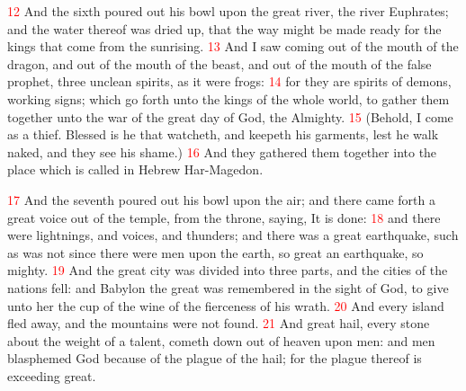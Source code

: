 \documentclass[12pt,twoside]{memoir}
\newcommand{\vnum}[1]{\textcolor{red}{\normalsize{#1}}}
\begin{document}
\vnum{12} And the sixth poured out his bowl upon the great river, the river Euphrates; and the water thereof was dried up, that the way might be made ready for the kings that come from the sunrising. 
\vnum{13} And I saw coming out of the mouth of the dragon, and out of the mouth of the beast, and out of the mouth of the false prophet, three unclean spirits, as it were frogs: 
\vnum{14} for they are spirits of demons, working signs; which go forth unto the kings of the whole world, to gather them together unto the war of the great day of God, the Almighty. 
\vnum{15} (Behold, I come as a thief. Blessed is he that watcheth, and keepeth his garments, lest he walk naked, and they see his shame.) 
\vnum{16} And they gathered them together into the place which is called in Hebrew Har-Magedon.

\vnum{17} And the seventh poured out his bowl upon the air; and there came forth a great voice out of the temple, from the throne, saying, It is done: 
\vnum{18} and there were lightnings, and voices, and thunders; and there was a great earthquake, such as was not since there were men upon the earth, so great an earthquake, so mighty. 
\vnum{19} And the great city was divided into three parts, and the cities of the nations fell: and Babylon the great was remembered in the sight of God, to give unto her the cup of the wine of the fierceness of his wrath. 
\vnum{20} And every island fled away, and the mountains were not found. 
\vnum{21} And great hail, every stone about the weight of a talent, cometh down out of heaven upon men: and men blasphemed God because of the plague of the hail; for the plague thereof is exceeding great.

\end{document}
